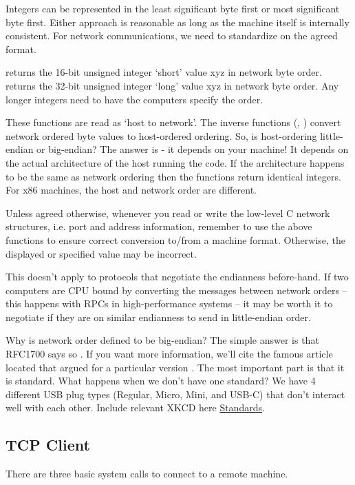 Integers can be represented in the least significant byte first or most significant byte first.
Either approach is reasonable as long as the machine itself is internally consistent.
For network communications, we need to standardize on the agreed format.

 returns the 16-bit unsigned integer `short' value xyz in network byte order.
 returns the 32-bit unsigned integer `long' value xyz in network byte order.
Any longer integers need to have the computers specify the order.

These functions are read as `host to network'.
The inverse functions (, ) convert network ordered byte values to host-ordered ordering.
So, is host-ordering little-endian or big-endian?
The answer is - it depends on your machine!
It depends on the actual architecture of the host running the code.
If the architecture happens to be the same as network ordering then the functions return identical integers.
For x86 machines, the host and network order are different.

Unless agreed otherwise, whenever you read or write the low-level C network structures, i.e. port and address information, remember to use the above functions to ensure correct conversion to/from a machine format.
Otherwise, the displayed or specified value may be incorrect.

This doesn't apply to protocols that negotiate the endianness before-hand.
If two computers are CPU bound by converting the messages between network orders -- this happens with RPCs in high-performance systems -- it may be worth it to negotiate if they are on similar endianness to send in little-endian order.

Why is network order defined to be big-endian?
The simple answer is that RFC1700 says so \cite{RFC1700}.
If you want more information, we'll cite the famous article located that argued for a particular version \cite{cohen_1980}.
The most important part is that it is standard.
What happens when we don't have one standard?
We have 4 different USB plug types (Regular, Micro, Mini, and USB-C) that don't interact well with each other.
Include relevant XKCD here \href{https://xkcd.com/927/}{Standards}.

\subsection{TCP Client}

There are three basic system calls to connect to a remote machine.

